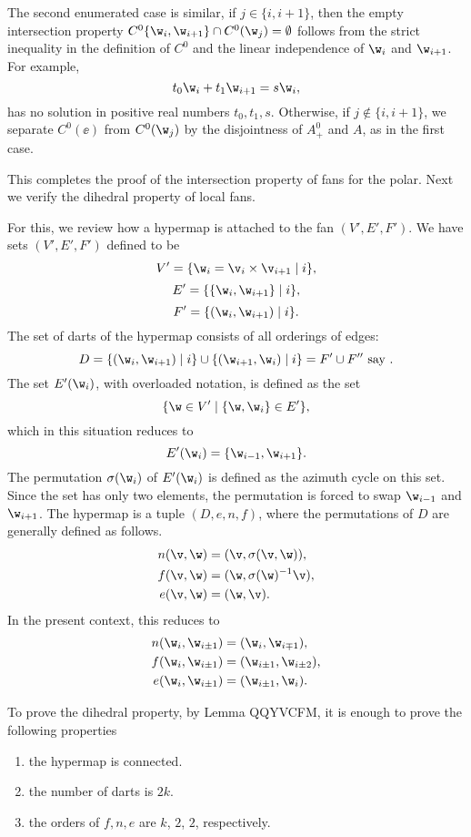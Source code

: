 The second enumerated case is similar,  if $j\in\{i,i+1\}$, then the empty
intersection property $C^0\{\w_i,\w_{i+1}\}\cap C^0(\w_j)=\emptyset$
follows from the strict inequality in the definition of $C^0$ and the
linear independence of $\w_i$ and $\w_{i+1}$.  For example,
\[
t_0 \w_i + t_1 \w_{i+1} = s \w_i,
\]
has no solution in positive real numbers $t_0,t_1,s$.
Otherwise, if $j\not\in\{i,i+1\}$,
we separate $C^0(\ee)$ from $C^0(\w_j)$ by the disjointness of $A_+^0$ and $A$, 
as in the first case.

This completes the proof of the intersection property of fans for the polar.
Next we verify the dihedral property of local fans. 


For this, we review how
a hypermap is attached to the fan $(V',E',F')$.
We have sets $(V',E',F')$ defined to be
\[
V' = \{ \w_i = \v_i \times \v_{i+1}\mid i\},
\]
\[
E' = \{\{\w_i,\w_{i+1}\}\mid i\},
\]
\[
F' = \{(\w_i,\w_{i+1})\mid i\}.
\]
The set of darts of the hypermap consists of all orderings of edges:
\[
D  =\{(\w_i,\w_{i+1}) \mid i\} \cup \{(\w_{i+1},\w_i)\mid i\} = F' \cup F'' \text{ say }.
\]
The set $E'(\w_i)$, with overloaded notation, is defined as the set
\[
\{\w\in V' \mid \{\w,\w_i\}\in E'\},
\]
which in this situation reduces to
\[
E'(\w_i) = \{\w_{i-1},\w_{i+1}\}.
\]
The permutation $\sigma(\w_i)$ of $E'(\w_i)$ is defined as the azimuth
cycle on this set.  Since the set has only two elements, the permutation is
forced to swap $\w_{i-1}$ and $\w_{i+1}$.
The hypermap is a tuple $(D,e,n,f)$, where the permutations of $D$ are
generally defined as follows.
\begin{align*}n(\v,\w) &= (\v,\sigma(\v,\w)),\\
f (\v,\w) &= (\w,\sigma(\w)^{-1} \v),\\
e (\v,\w) &= (\w,\v).
\end{align*}
In the present context, this reduces to
\begin{align*}n(\w_i,\w_{i\pm 1}) &= (\w_i,\w_{i\mp 1}),\\
f (\w_i,\w_{i\pm1}) &= (\w_{i\pm1},\w_{i\pm2}),\\
e (\w_i,\w_{i\pm 1}) &= (\w_{i\pm 1},\w_i).
\end{align*}

To prove the dihedral property, by Lemma QQYVCFM, it is enough
to prove the following properties
\begin{enumerate}
\item the hypermap is connected.
\item the number of darts is $2k$.
\item the orders of $f,n,e$ are $k$, $2$, $2$, respectively.
\end{enumerate}

